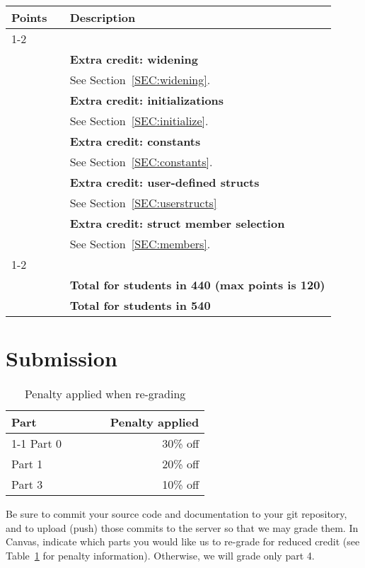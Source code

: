 \documentclass{article}
\makeatletter
\newcommand{\gradeline}{ \cline{1-2} \cline{4-4} ~\\[-1.5ex] }
\newenvironment{gradetable}{\begin{longtable}{@{}rrcp{5in}} \multicolumn{2}{l}{\bf Points} & & {\bf Description}\\ \gradeline}{\end{longtable}}
\newcommand{\mainitem}[2]{\pagebreak[2] {\bf #1} &&& {\bf #2}}
\newcommand{\mainpara}[1]{~ &&& {#1} }
\newcommand{\parser}{3}
\newcommand{\typecheck}{4}
\makeatother
\begin{document}
\begin{gradetable}
  \mainitem{5}{Extra credit: widening}
  \\[1mm]
  \mainpara{%
    See Section~\ref{SEC:widening}.
  }
  \\[4mm]

  \mainitem{5}{Extra credit: initializations}
  \\[1mm]
  \mainpara{%
    See Section~\ref{SEC:initialize}.
  }
  \\[4mm]
  \mainitem{5}{Extra credit: constants}
  \\[1mm]
  \mainpara{%
    See Section~\ref{SEC:constants}.
  }
  \\[4mm]

  \mainitem{10}{Extra credit: user-defined structs}
  \\[1mm]
  \mainpara{%
    See Section~\ref{SEC:userstructs}
  }
  \\[4mm]

  \mainitem{5}{Extra credit: struct member selection}
  \\[1mm]
  \mainpara{%
    See Section~\ref{SEC:members}.
  }
  \\[4mm]

  \gradeline
  \mainitem{100}{Total for students in 440 (max points is 120)}
  \\
  \mainitem{115}{Total for students in 540}
\end{gradetable}


\section{Submission}

\begin{table}[h]
\centering

  \begin{tabular}{lcr}
    {\bf Part} & ~~~~ & {\bf Penalty applied} \\ \cline{1-1}\cline{3-3}
    Part 0 && 30\% off \\
    Part 1 && 20\% off \\
    Part \parser && 10\% off
  \end{tabular}

\caption{Penalty applied when re-grading}
\label{TAB:penalties}
\end{table}

Be sure to commit your source code and documentation to your
git repository, and to upload (push) those commits to the server
so that we may grade them.
In Canvas,
indicate which parts you would like us to re-grade for reduced credit
(see Table~\ref{TAB:penalties} for penalty information).
Otherwise, we will grade only part \typecheck.
\end{document}
